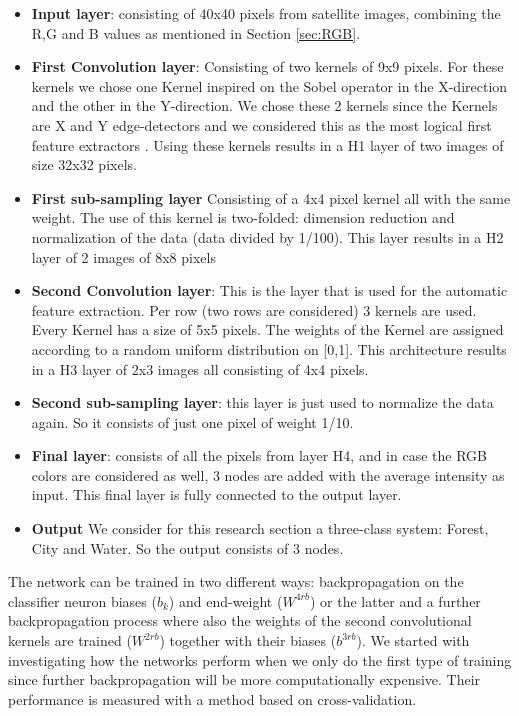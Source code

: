 \documentclass[a4paper,onecolumn]{report}
\begin{document}
\begin{itemize}
\item \textbf{Input layer}: consisting of 40x40 pixels from satellite images, combining the R,G and B values as mentioned in Section \ref{sec:RGB}.
\item \textbf{First Convolution layer}: Consisting of two kernels of 9x9 pixels. For these kernels we chose one Kernel inspired on the Sobel operator in the X-direction and the other in the Y-direction. We chose these 2 kernels since the Kernels are X and Y edge-detectors and we considered this as the most logical first feature extractors \cite{kanopoulos1988design}. Using these kernels results in a H1 layer of two images of size 32x32 pixels.
\item \textbf{First sub-sampling layer} Consisting of a 4x4 pixel kernel all with the same weight. The use of this kernel is two-folded: dimension reduction and normalization of the data (data divided by 1/100). This layer results in a H2 layer of 2 images of 8x8 pixels
\item \textbf{Second Convolution layer}: This is the layer that is used for the automatic feature extraction. Per row (two rows are considered) 3 kernels are used. Every Kernel has a size of 5x5 pixels. The weights of the Kernel are assigned according to a random uniform distribution on [0,1]. This architecture results in a H3 layer of 2x3 images all consisting of 4x4 pixels.
\item \textbf{Second sub-sampling layer}: this layer is just used to normalize the data again. So it consists of just one pixel of weight 1/10. 
\item \textbf{Final layer}: consists of all the pixels from layer H4, and in case the RGB colors are considered as well, 3 nodes are added with the average intensity as input. This final layer is fully connected to the output layer. 
\item \textbf{Output} We consider for this research section a three-class system: Forest, City and Water. So the output consists of 3 nodes.
\end{itemize} 
The network can be trained in two different ways: backpropagation on the classifier neuron biases ($b_{k}$) and end-weight ($ W^{4rb}$) or the latter and a further backpropagation process where also the weights of the second convolutional kernels are trained ($ W^{2rb} $) together with their biases ($b^{3rb}$). We started with investigating how the networks perform when we only do the first type of training since further backpropagation will be more computationally expensive. Their performance is measured with a method based on cross-validation.
\end{document}
